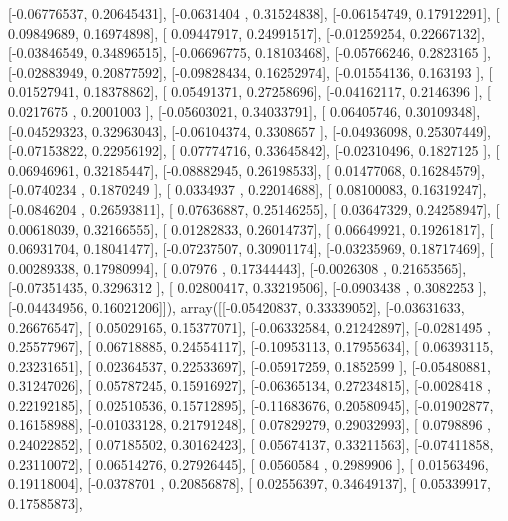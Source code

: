 \documentclass{article}
\begin{document}
       [-0.06776537,  0.20645431],
       [-0.0631404 ,  0.31524838],
       [-0.06154749,  0.17912291],
       [ 0.09849689,  0.16974898],
       [ 0.09447917,  0.24991517],
       [-0.01259254,  0.22667132],
       [-0.03846549,  0.34896515],
       [-0.06696775,  0.18103468],
       [-0.05766246,  0.2823165 ],
       [-0.02883949,  0.20877592],
       [-0.09828434,  0.16252974],
       [-0.01554136,  0.163193  ],
       [ 0.01527941,  0.18378862],
       [ 0.05491371,  0.27258696],
       [-0.04162117,  0.2146396 ],
       [ 0.0217675 ,  0.2001003 ],
       [-0.05603021,  0.34033791],
       [ 0.06405746,  0.30109348],
       [-0.04529323,  0.32963043],
       [-0.06104374,  0.3308657 ],
       [-0.04936098,  0.25307449],
       [-0.07153822,  0.22956192],
       [ 0.07774716,  0.33645842],
       [-0.02310496,  0.1827125 ],
       [ 0.06946961,  0.32185447],
       [-0.08882945,  0.26198533],
       [ 0.01477068,  0.16284579],
       [-0.0740234 ,  0.1870249 ],
       [ 0.0334937 ,  0.22014688],
       [ 0.08100083,  0.16319247],
       [-0.0846204 ,  0.26593811],
       [ 0.07636887,  0.25146255],
       [ 0.03647329,  0.24258947],
       [ 0.00618039,  0.32166555],
       [ 0.01282833,  0.26014737],
       [ 0.06649921,  0.19261817],
       [ 0.06931704,  0.18041477],
       [-0.07237507,  0.30901174],
       [-0.03235969,  0.18717469],
       [ 0.00289338,  0.17980994],
       [ 0.07976   ,  0.17344443],
       [-0.0026308 ,  0.21653565],
       [-0.07351435,  0.3296312 ],
       [ 0.02800417,  0.33219506],
       [-0.0903438 ,  0.3082253 ],
       [-0.04434956,  0.16021206]]), array([[-0.05420837,  0.33339052],
       [-0.03631633,  0.26676547],
       [ 0.05029165,  0.15377071],
       [-0.06332584,  0.21242897],
       [-0.0281495 ,  0.25577967],
       [ 0.06718885,  0.24554117],
       [-0.10953113,  0.17955634],
       [ 0.06393115,  0.23231651],
       [ 0.02364537,  0.22533697],
       [-0.05917259,  0.1852599 ],
       [-0.05480881,  0.31247026],
       [ 0.05787245,  0.15916927],
       [-0.06365134,  0.27234815],
       [-0.0028418 ,  0.22192185],
       [ 0.02510536,  0.15712895],
       [-0.11683676,  0.20580945],
       [-0.01902877,  0.16158988],
       [-0.01033128,  0.21791248],
       [ 0.07829279,  0.29032993],
       [ 0.0798896 ,  0.24022852],
       [ 0.07185502,  0.30162423],
       [ 0.05674137,  0.33211563],
       [-0.07411858,  0.23110072],
       [ 0.06514276,  0.27926445],
       [ 0.0560584 ,  0.2989906 ],
       [ 0.01563496,  0.19118004],
       [-0.0378701 ,  0.20856878],
       [ 0.02556397,  0.34649137],
       [ 0.05339917,  0.17585873],
\end{document}
